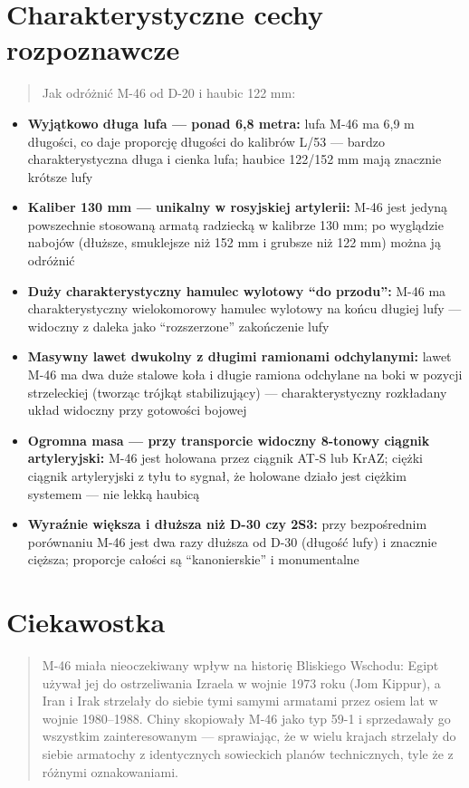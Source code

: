 \documentclass[12pt,openany,oneside]{book}
\providecommand{\tightlist}{%
  \setlength{\itemsep}{0pt}\setlength{\parskip}{0pt}}
\begin{document}
\section{Charakterystyczne cechy
rozpoznawcze}\label{charakterystyczne-cechy-rozpoznawcze-18}

\begin{quote}
Jak odróżnić M-46 od D-20 i haubic 122 mm:
\end{quote}

\begin{itemize}
\tightlist
\item
  \textbf{Wyjątkowo długa lufa --- ponad 6,8 metra:} lufa M-46 ma 6,9 m
  długości, co daje proporcję długości do kalibrów L/53 --- bardzo
  charakterystyczna długa i cienka lufa; haubice 122/152 mm mają
  znacznie krótsze lufy
\item
  \textbf{Kaliber 130 mm --- unikalny w rosyjskiej artylerii:} M-46 jest
  jedyną powszechnie stosowaną armatą radziecką w kalibrze 130 mm; po
  wyglądzie nabojów (dłuższe, smuklejsze niż 152 mm i grubsze niż 122
  mm) można ją odróżnić
\item
  \textbf{Duży charakterystyczny hamulec wylotowy ``do przodu'':} M-46
  ma charakterystyczny wielokomorowy hamulec wylotowy na końcu długiej
  lufy --- widoczny z daleka jako ``rozszerzone'' zakończenie lufy
\item
  \textbf{Masywny lawet dwukolny z długimi ramionami odchylanymi:} lawet
  M-46 ma dwa duże stalowe koła i długie ramiona odchylane na boki w
  pozycji strzeleckiej (tworząc trójkąt stabilizujący) ---
  charakterystyczny rozkładany układ widoczny przy gotowości bojowej
\item
  \textbf{Ogromna masa --- przy transporcie widoczny 8-tonowy ciągnik
  artyleryjski:} M-46 jest holowana przez ciągnik AT-S lub KrAZ; ciężki
  ciągnik artyleryjski z tyłu to sygnał, że holowane działo jest ciężkim
  systemem --- nie lekką haubicą
\item
  \textbf{Wyraźnie większa i dłuższa niż D-30 czy 2S3:} przy
  bezpośrednim porównaniu M-46 jest dwa razy dłuższa od D-30 (długość
  lufy) i znacznie cięższa; proporcje całości są ``kanonierskie'' i
  monumentalne
\end{itemize}

\section{Ciekawostka}\label{ciekawostka-18}

\begin{quote}
M-46 miała nieoczekiwany wpływ na historię Bliskiego Wschodu: Egipt
używał jej do ostrzeliwania Izraela w wojnie 1973 roku (Jom Kippur), a
Iran i Irak strzelały do siebie tymi samymi armatami przez osiem lat w
wojnie 1980--1988. Chiny skopiowały M-46 jako typ 59-1 i sprzedawały go
wszystkim zainteresowanym --- sprawiając, że w wielu krajach strzelały
do siebie armatochy z identycznych sowieckich planów technicznych, tyle
że z różnymi oznakowaniami.
\end{quote}
\end{document}
